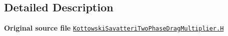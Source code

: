 \subsection{Detailed Description}
{\bfseries Original source file} \href{../../../home/carlo/data/GeN-Foam/GeN-Foam_ffn/GeN-Foam/GeN-Foam/classes/thermalHydraulics/src/physicsModels/dragModels/twoPhaseDragMultiplierModels/KottowskiSavatteri/KottowskiSavatteriTwoPhaseDragMultiplier.H}{\tt Kottowski\+Savatteri\+Two\+Phase\+Drag\+Multiplier.\+H} 